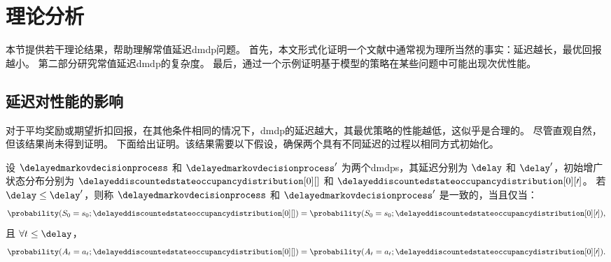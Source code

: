 \section{理论分析}
\label{sec:th_analysis_belief}

本节提供若干理论结果，帮助理解常值延迟\gls{dmdp}问题。
首先，本文形式化证明一个文献中通常视为理所当然的事实：延迟越长，最优回报越小。
第二部分研究常值延迟\gls{dmdp}的复杂度。
最后，通过一个示例证明基于模型的策略在某些问题中可能出现次优性能。


\subsection{延迟对性能的影响}
\label{subsec:effect_delay_belief}
对于平均奖励或期望折扣回报，在其他条件相同的情况下，\gls{dmdp}的延迟越大，其最优策略的性能越低，这似乎是合理的。
尽管直观自然，但该结果尚未得到证明。
下面给出证明。该结果需要以下假设，确保两个具有不同延迟的过程以相同方式初始化。

\begin{defi}
\label{def:consistency_dmdps}
     设 $\delayedmarkovdecisionprocess$ 和 $\delayedmarkovdecisionprocess'$ 为两个\glspl{dmdp}，其延迟分别为 $\delay$ 和 $\delay'$，初始增广状态分布分别为 $\delayeddiscountedstateoccupancydistribution[0][]$ 和 $\delayeddiscountedstateoccupancydistribution[0][\prime]$。
     若 $\delay\le \delay'$，则称 $\delayedmarkovdecisionprocess$ 和 $\delayedmarkovdecisionprocess'$ 是一致的，当且仅当：
    \begin{align*}
        \probability(S_0=s_0;\delayeddiscountedstateoccupancydistribution[0][])= \probability(S_0=s_0;\delayeddiscountedstateoccupancydistribution[0][\prime]),
    \end{align*}
    且 $\forall t\le\delay$，
    \begin{align*}
        \probability(A_t=a_t;\delayeddiscountedstateoccupancydistribution[0][])= \probability(A_t=a_t;\delayeddiscountedstateoccupancydistribution[0][\prime]).
    \end{align*}
\end{defi}



